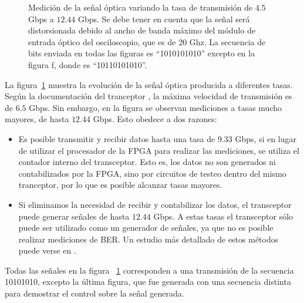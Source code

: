\begin{figure}[!t]
   \qquad
  \caption {Medición de la señal óptica variando la tasa de transmisión de $4.5$ Gbps a $12.44$ Gbps. Se debe tener en cuenta que la señal será distorsionada debido al ancho de banda máximo del módulo de entrada óptico del osciloscopio, que es de 20 Ghz. La secuencia de bits enviada en todas las figuras es ``1010101010'' excepto en la figura f, donde es ``10110101010''.}
  \label{fig:ImgTasa}
\end{figure}





La figura~\ref{fig:ImgTasa} muestra la evolución de la señal óptica producida a diferentes
tasas. Según la documentación del tranceptor \cite{ug198}, la máxima velocidad de transmisión es de $6.5$ Gbps. Sin embargo, en la figura se observan mediciones a tasas mucho mayores, de hasta $12.44$ Gbps. Esto obedece a dos razones:
\begin{itemize}
 \item Es posible transmitir y recibir datos hasta una tasa de 9.33 Gbps, si en lugar de utilizar el procesador de la FPGA para realizar las mediciones, se utiliza el contador interno del transceptor. Esto es, los datos no son generados ni contabilizados por la FPGA, sino por circuitos de testeo dentro del mismo tranceptor, por lo que es posible alcanzar tasas mayores.
 \item Si eliminamos la necesidad de recibir y contabilizar los datos, el transceptor puede generar señales de hasta $12.44$ Gbps. A estas tasas el transceptor sólo puede ser utilizado como un generador de señales, ya que no es posible realizar mediciones de BER. Un estudio más detallado de estos métodos puede verse en \cite{OBGAH2010}.
\end{itemize}


Todas las señales en la figura ~\ref{fig:ImgTasa} corresponden a una transmisión de la secuencia 10101010, excepto la última figura,
que fue generada con una secuencia distinta para demostrar el control sobre la señal generada.

